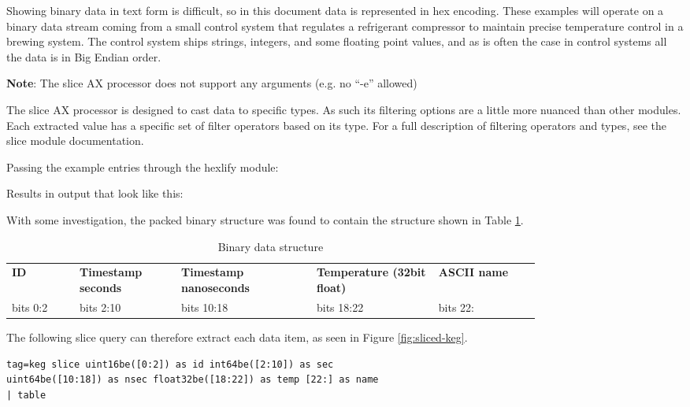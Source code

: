 Showing binary data in text form is difficult, so in this document data
is represented in hex encoding. These examples will operate on a binary
data stream coming from a small control system that regulates a
refrigerant compressor to maintain precise temperature control in a
brewing system. The control system ships strings, integers, and some
floating point values, and as is often the case in control systems all
the data is in Big Endian order.

\textbf{Note}: The slice AX processor does not support any arguments (e.g. no
``-e'' allowed)

The slice AX processor is designed to cast data to specific types. As
such its filtering options are a little more nuanced than other modules.
Each extracted value has a specific set of filter operators based on its
type. For a full description of filtering operators and types, see the
slice module documentation.

Passing the example entries through the hexlify module:


Results in output that look like this:


With some investigation, the packed binary structure was found to
contain the structure shown in Table \ref{table:keg-structure}.

\begin{table}[H]
\begin{tabular}{p{0.1\linewidth}p{0.15\linewidth}p{0.2\linewidth}p{0.18\linewidth}p{0.15\linewidth}}
\hline
\textbf{ID} & \textbf{Timestamp seconds} & \textbf{Timestamp nanoseconds} & \textbf{Temperature (32bit float)} & \textbf{ASCII name} \\
{bits 0:2} & {bits 2:10} & {bits 10:18} & {bits 18:22} & {bits 22:} \\
\hline
\end{tabular}
\caption{Binary data structure}
\label{table:keg-structure}
\end{table}

The following slice query can therefore extract each data item, as seen in Figure \ref{fig:sliced-keg}.

\begin{Verbatim}[breaklines=true]
tag=keg slice uint16be([0:2]) as id int64be([2:10]) as sec 
uint64be([10:18]) as nsec float32be([18:22]) as temp [22:] as name
| table
\end{Verbatim}

